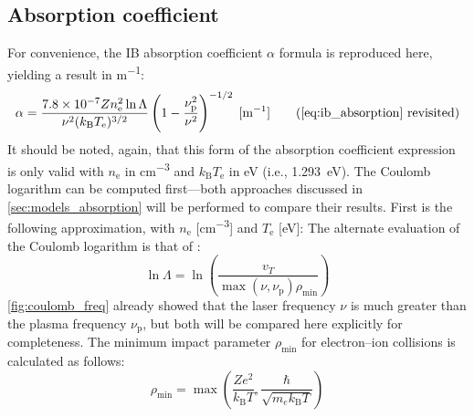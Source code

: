         \subsection{Absorption coefficient}
            For convenience, the IB absorption coefficient $\alpha$ formula is reproduced here, yielding a result in \unit{m^{-1}}:
            \begin{equation*}
                \ibalphaeq \tag{\ref{eq:ib_absorption} revisited}
            \end{equation*}
            It should be noted, again, that this form of the absorption coefficient expression is only valid with $n_\mathrm{e}$ in \unit{cm^{-3}} and $k_\mathrm{B}T_\mathrm{e}$ in \unit{eV} (i.e., \qty{1.293}{eV}). The Coulomb logarithm can be computed first---both approaches discussed in \autoref{sec:models_absorption} will be performed to compare their results. First is the following approximation, with $n_\mathrm{e}$ [\unit{cm^{-3}}] and $T_\mathrm{e}$ [eV]:
            The alternate evaluation of the Coulomb logarithm is that of \textcite{johnstonCorrectValuesHighfrequency1973}:
            \begin{equation*}
                \ln{\Lambda} = \ln{\left(\frac{v_T}{\max{(\nu, \nu_\mathrm{p})}\rho_\mathrm{min}}\right)}
            \end{equation*}
            \autoref{fig:coulomb_freq} already showed that the laser frequency $\nu$ is much greater than the plasma frequency $\nu_\mathrm{p}$, but both will be compared here explicitly for completeness.
            The minimum impact parameter $\rho_\mathrm{min}$ for electron--ion collisions is calculated as follows:
            \begin{equation*}
                \rho_\mathrm{min} = \max{\left(\frac{Ze^2}{k_\mathrm{B}T}, \frac{\hbar}{\sqrt{m_ek_\mathrm{B}T}}\right)}
            \end{equation*}
